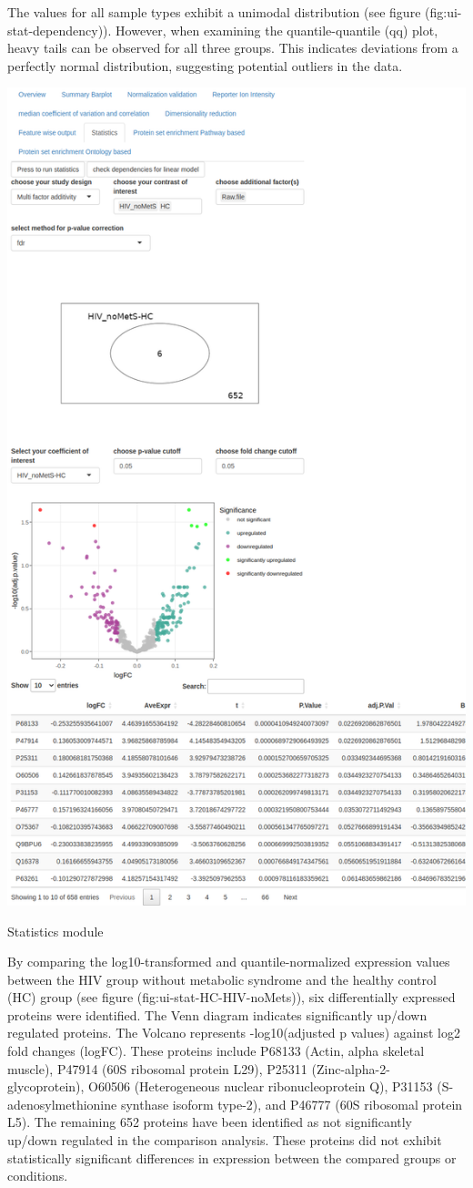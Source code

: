 \documentclass[
  11pt,
]{article}
\let\origfigure\figure
\begin{document}
The values for all sample types exhibit a unimodal distribution (see figure (fig:ui-stat-dependency)). However, when examining the quantile-quantile (qq) plot, heavy tails can be observed for all three groups. This indicates deviations from a perfectly normal distribution, suggesting potential outliers in the data.

\newpage
\bgroup  \origfigure[H] 

{\centering \includegraphics[width=0.7\linewidth]{screenshots/stat_HC_HIV_noMets} 

}

\caption{Statistics module}\label{fig:ui-stat-HC-HIV-noMets}
 \endfigure\egroup

\newpage

By comparing the log10-transformed and quantile-normalized expression values between the HIV group without metabolic syndrome and the healthy control (HC) group (see figure (fig:ui-stat-HC-HIV-noMets)), six differentially expressed proteins were identified. The Venn diagram indicates significantly up/down regulated proteins. The Volcano represents -log10(adjusted p values) against log2 fold changes (logFC).
These proteins include P68133 (Actin, alpha skeletal muscle), P47914 (60S ribosomal protein L29), P25311 (Zinc-alpha-2-glycoprotein), O60506 (Heterogeneous nuclear ribonucleoprotein Q), P31153 (S-adenosylmethionine synthase isoform type-2), and P46777 (60S ribosomal protein L5). The remaining 652 proteins have been identified as not significantly up/down regulated in the comparison analysis. These proteins did not exhibit statistically significant differences in expression between the compared groups or conditions.
\end{document}

